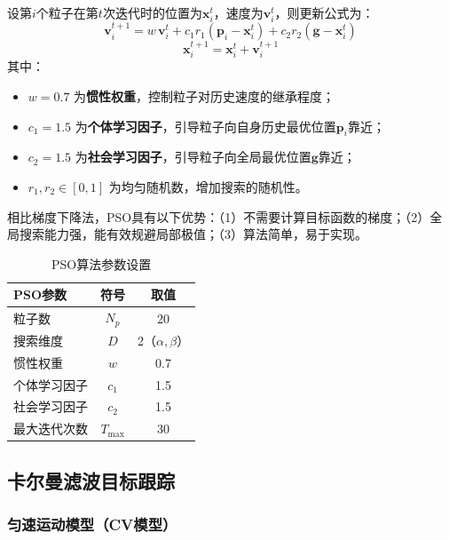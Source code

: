 \documentclass[12pt, a4paper]{article}
\begin{document}
设第$i$个粒子在第$t$次迭代时的位置为$\bm{x}_i^t$，速度为$\bm{v}_i^t$，则更新公式为：
\begin{equation}
  \bm{v}_i^{t+1} = w\,\bm{v}_i^t
  + c_1 r_1 \left(\bm{p}_i - \bm{x}_i^t\right)
  + c_2 r_2 \left(\bm{g} - \bm{x}_i^t\right)
  \label{eq:pso_velocity}
\end{equation}
\begin{equation}
  \bm{x}_i^{t+1} = \bm{x}_i^t + \bm{v}_i^{t+1}
  \label{eq:pso_position}
\end{equation}
其中：
\begin{itemize}
  \item $w = 0.7$ 为\textbf{惯性权重}，控制粒子对历史速度的继承程度；
  \item $c_1 = 1.5$ 为\textbf{个体学习因子}，引导粒子向自身历史最优位置$\bm{p}_i$靠近；
  \item $c_2 = 1.5$ 为\textbf{社会学习因子}，引导粒子向全局最优位置$\bm{g}$靠近；
  \item $r_1, r_2 \in [0, 1]$ 为均匀随机数，增加搜索的随机性。
\end{itemize}

相比梯度下降法，PSO具有以下优势：（1）不需要计算目标函数的梯度；（2）全局搜索能力强，能有效规避局部极值；（3）算法简单，易于实现。

\begin{table}[H]
\centering
\begin{tabularx}{0.72\textwidth}{LCC}
\toprule
{}\color{white}\bfseries PSO参数 &
  \color{white}\bfseries 符号 &
  \color{white}\bfseries 取值 \\
\midrule
粒子数 & $N_p$ & 20 \\
搜索维度 & $D$ & 2（$\alpha, \beta$） \\
惯性权重 & $w$ & 0.7 \\
个体学习因子 & $c_1$ & 1.5 \\
社会学习因子 & $c_2$ & 1.5 \\
最大迭代次数 & $T_{\max}$ & 30 \\
\bottomrule
\end{tabularx}
\caption{PSO算法参数设置}
\label{tab:pso}
\end{table}

\subsection{卡尔曼滤波目标跟踪}
\label{sec:kalman}

\subsubsection{匀速运动模型（CV模型）}
\end{document}
